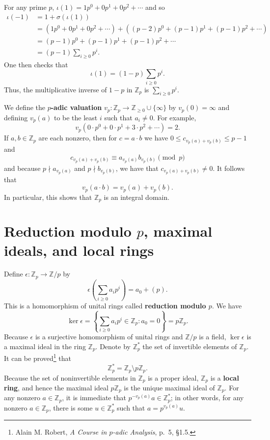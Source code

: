 \documentclass{article}
\theoremstyle{definition}
\begin{document}
For any prime $p$, $\iota(1)=1p^0+0p^1+0p^2+\cdots$ and so
\begin{align*}
\iota(-1)&=1+\sigma(\iota(1)) \\
&= (1p^0+0p^1+0p^2+\cdots)+ ((p-2)p^0+(p-1)p^1+(p-1)p^2+\cdots)\\
&=(p-1)p^0+(p-1)p^1+(p-1)p^2+\cdots\\
&=(p-1)\sum_{i\geq 0}p^i.
\end{align*}
One then checks that
\[
\iota(1) = (1-p) \sum_{i \geq 0}p^i.
\]
Thus, the multiplicative inverse of $1-p$ in $\mathbb{Z}_p$ is $\sum_{i \geq 0}p^i$. 

We define the \textbf{$p$-adic valuation} $v_p:\mathbb{Z}_p \to \mathbb{Z}_{\geq 0} \cup \{\infty\}$ by
$v_p(0)=\infty$ and  defining $v_p(a)$ to be the least $i$ such that $a_i \neq 0$. For example,
\[
v_p(0\cdot p^0 + 0\cdot p^1+3\cdot p^2+\cdots) = 2.
\]
If $a,b \in \mathbb{Z}_p$ are each nonzero, then for $c=a\cdot b$ we have $0 \leq c_{v_p(a)+v_p(b)} \leq p-1$ and
\[
c_{v_p(a)+v_p(b)} \equiv a_{v_p(a)} b_{v_p(b)} \pmod{p}
\]
and because $p \nmid a_{v_p(a)}$ and $p \nmid b_{v_p(b)}$,
we have that $c_{v_p(a)+v_p(b)} \neq 0$. It follows that
\[
v_p(a\cdot b) = v_p(a) + v_p(b).
\]
In particular, this shows that $\mathbb{Z}_p$ is an integral domain. 


\section{Reduction modulo $p$, maximal ideals, and local rings}
Define $\epsilon:\mathbb{Z}_p \to \mathbb{Z}/p$ by
\[
\epsilon\left(\sum_{i \geq 0} a_i p^i\right) = a_0 + (p).
\]
This is a homomorphism of unital rings called \textbf{reduction modulo $p$}. We have
\[
\ker \epsilon =\left\{\sum_{i \geq 0} a_i p^i \in \mathbb{Z}_p: a_0 =0 \right\}
=p\mathbb{Z}_p.
\]
Because $\epsilon$ is a surjective homomorphism of unital rings and $\mathbb{Z}/p$ is a field, $\ker \epsilon$ is a maximal ideal
in the ring $\mathbb{Z}_p$. Denote by $\mathbb{Z}_p^*$ the set of invertible elements of $\mathbb{Z}_p$. It can be proved\footnote{Alain M. Robert, {\em A Course in $p$-adic Analysis},
p.~5, \S 1.5.}
 that
 \[
\mathbb{Z}_p^*=\mathbb{Z}_p \setminus p\mathbb{Z}_p.
\]
Because the set of noninvertible elements in $\mathbb{Z}_p$ is a proper ideal, $\mathbb{Z}_p$ is a \textbf{local ring},
and hence the maximal ideal $p\mathbb{Z}_p$ is the unique maximal ideal of $\mathbb{Z}_p$. 
For any nonzero $a \in \mathbb{Z}_p$, it is immediate that $p^{-v_p(a)}a \in \mathbb{Z}_p^*$; in other words, for any nonzero
$a \in \mathbb{Z}_p$, there is some $u \in \mathbb{Z}_p^*$ such that $a=p^{v_p(a)} u$. 
\end{document}
